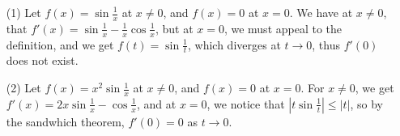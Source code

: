 \begin{example}
    \begin{enumerate}
        \item[(1)] Let $f(x)=\sin{\frac{1}{x}}$ at $x \neq 0$, and  $f(x)=0$ at  $x=0$. We
            have at $x \neq 0$, that  $f'(x)=\sin{\frac{1}{x}}-\frac{1}{x}\cos{\frac{1}{x}}$, but
            at $x=0$, we must appeal to the definition, and we get  $f(t)=\sin{\frac{1}{t}}$, which
            diverges at $t \rightarrow 0$, thus  $f'(0)$ does not exist.

        \item[(2)] Let $f(x)=x^2\sin{\frac{1}{x}}$ at $x \neq 0$, and  $f(x)=0$ at  $x=0$. For
            $x \neq 0$, we get  $f'(x)=2x\sin{\frac{1}{x}}-\cos{\frac{1}{x}}$, and at $x = 0$,
            we notice that  $|t\sin{\frac{1}{t}}| \leq |t|$, so by the sandwhich theorem, $f'(0)=0$
            as  $t \rightarrow 0$.
    \end{enumerate}
\end{example}
